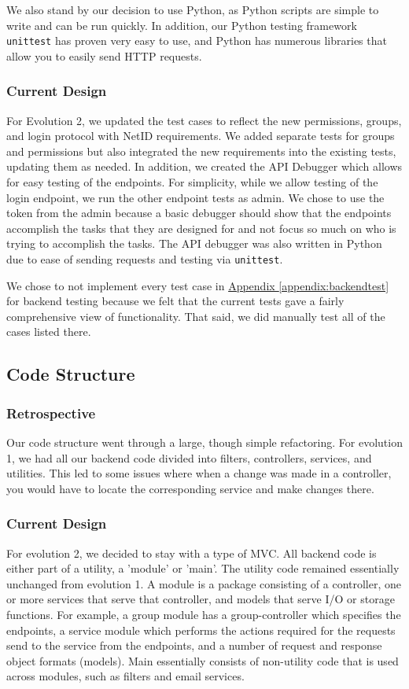 \documentclass[12pt]{article}
\begin{document}
We also stand by our decision to use Python, as Python scripts are simple to write and can be run quickly. In addition, our Python testing framework  \texttt{unittest} has proven very easy to use, and Python has numerous libraries that allow you to easily send HTTP requests. 

\subsubsection{Current Design}
For Evolution 2, we updated the test cases to reflect the new permissions, groups, and login protocol with NetID requirements. We added separate tests for groups and permissions but also integrated the new requirements into the existing tests, updating them as needed. In addition, we created the API Debugger which allows for easy testing of the endpoints. For simplicity, while we allow testing of the login endpoint, we run the other endpoint tests as admin. We chose to use the token from the admin because a basic debugger should show that the endpoints accomplish the tasks that they are designed for and not focus so much on who is trying to accomplish the tasks. The API debugger was also written in Python due to ease of sending requests and testing via \texttt{unittest}. 

We chose to not implement every test case in \hyperref[appendix:backendtest]{Appendix \ref{appendix:backendtest}} for backend testing because we felt that the current tests gave a fairly comprehensive view of functionality. That said, we did manually test all of the cases listed there.


\subsection{Code Structure}
\subsubsection{Retrospective}
Our code structure went through a large, though simple refactoring. For evolution 1, we had all our backend code divided into filters, controllers, services, and utilities. This led to some issues where when a change was made in a controller, you would have to locate the corresponding service and make changes there. 
\subsubsection{Current Design}
For evolution 2, we decided to stay with a type of MVC. All backend code is either part of a utility, a 'module' or 'main'. The utility code remained essentially unchanged from evolution 1. A module is a package consisting of a controller, one or more services that serve that controller, and models that serve I/O or storage functions. For example, a group module has a group-controller which specifies the endpoints, a service module which performs the actions required for the requests send to the service from the endpoints, and a number of request and response object formats (models). Main essentially consists of non-utility code that is used across modules, such as filters and email services. 
\end{document}
